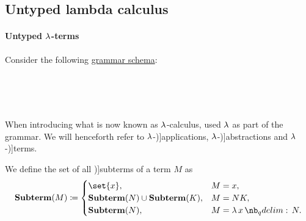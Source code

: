 \subsection{Untyped lambda calculus}\label{subsec:untyped_lambda_calculus}

\paragraph{Untyped \( \synlambda \)-terms}

\begin{definition}\label{def:lambda_term}\mimprovised
  Consider the following \hyperref[def:formal_grammar/schema]{grammar schema}:
  \begin{bnf*}
        {} \\
     {\bnftsq{\( ( \)} \bnfsp {} \bnfsp {} \bnfsp \bnftsq{\( ) \)}} \\
     {\bnftsq{\( ( \)} \bnfsp \bnftsq{\( \synlambda \)} \bnfsp {} \bnfsp {} \bnfsp {} \bnfsp \bnftsq{\( ) \)}} \\
            { \bnfor {} \bnfor {}}
  \end{bnf*}

  When introducing what is now known as \( \synlambda \)-calculus,  used \( \synlambda \) as part of the grammar. We will henceforth refer to \( \synlambda \)-\term[ru=апликация (\cite[188]{Герасимов2011})]{applications}, \( \synlambda \)-\term[ru=абстракция (\cite[188]{Герасимов2011})]{abstractions} and \( \synlambda \)-\term[ru=терм (\cite[188]{Герасимов2011})]{terms}.

  \begin{thmenum}
     We define the set of all \term[ru=подтерм (\cite[189]{Герасимов2011})]{subterms} of a term \( M \) as
    \begin{equation*}
      \boldop{Subterm}(M) \coloneqq \begin{cases}
        \set{ x },                                    &M = x, \\
        \boldop{Subterm}(N) \cup \boldop{Subterm}(K), &M = N K, \\
        \boldop{Subterm}(N),                          &M = \qabs x N.
      \end{cases}
    \end{equation*}


\end{thmenum}
\end{definition}

